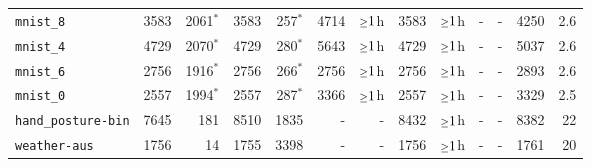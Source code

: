 \begin{tabular}{lrrrrrrrrrrrr}
\texttt{mnist\_8} & 3583 & 2061$^*$ & 3583 & 257$^*$ & 4714 & $\mathsmaller{\geq}1$h & 3583 & $\mathsmaller{\geq}1$h & - & - & 4250 & 2.6\\
\texttt{mnist\_4} & 4729 & 2070$^*$ & 4729 & 280$^*$ & 5643 & $\mathsmaller{\geq}1$h & 4729 & $\mathsmaller{\geq}1$h & - & - & 5037 & 2.6\\
\texttt{mnist\_6} & 2756 & 1916$^*$ & 2756 & 266$^*$ & 2756 & $\mathsmaller{\geq}1$h & 2756 & $\mathsmaller{\geq}1$h & - & - & 2893 & 2.6\\
\texttt{mnist\_0} & 2557 & 1994$^*$ & 2557 & 287$^*$ & 3366 & $\mathsmaller{\geq}1$h & 2557 & $\mathsmaller{\geq}1$h & - & - & 3329 & 2.5\\
\texttt{hand\_posture-bin} & 7645 & 181 & 8510 & 1835 & - & - & 8432 & $\mathsmaller{\geq}1$h & - & - & 8382 & 22\\
\texttt{weather-aus} & 1756 & 14 & 1755 & 3398 & - & - & 1756 & $\mathsmaller{\geq}1$h & - & - & 1761 & 20\\
\bottomrule
\end{tabular}
